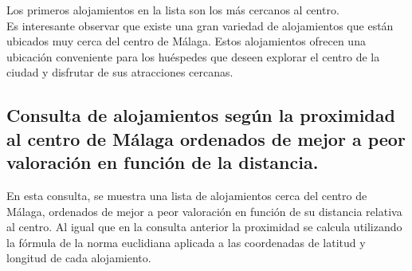 Los primeros alojamientos en la lista son los más cercanos al centro.  \\
Es interesante observar que existe una gran variedad de alojamientos que están ubicados muy cerca del centro de Málaga. Estos alojamientos ofrecen una ubicación conveniente para los huéspedes que deseen explorar el centro de la ciudad y disfrutar de sus atracciones cercanas.
\newpage
\subsection{Consulta de alojamientos según la proximidad al centro de Málaga ordenados de mejor a peor valoración en función de la distancia.}
En esta consulta, se muestra una lista de alojamientos cerca del centro de Málaga, ordenados de mejor a peor valoración en función de su distancia relativa al centro. Al igual que en la consulta anterior la proximidad se calcula utilizando la fórmula de la norma euclidiana aplicada a las coordenadas de latitud y longitud de cada alojamiento.
